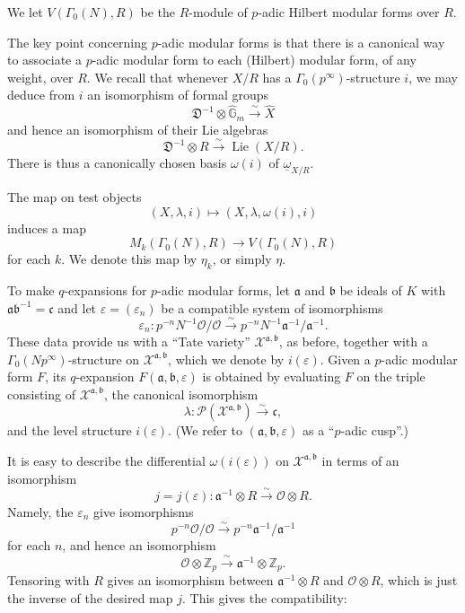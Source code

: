 \documentclass[12pt,a4paper]{article}
\theoremstyle{plain}
\theoremstyle{definition}
\theoremstyle{remark}
\DeclareMathOperator{\Lie}{Lie}
\begin{document}
We let $V(\Gamma_0(N), R)$ be the $R$-module of $p$-adic Hilbert modular forms over $R$.

The key point concerning $p$-adic modular forms is that there is a canonical way to associate a $p$-adic modular form to each (Hilbert) modular form, of any weight, over $R$. We recall that whenever $X/R$ has a $\Gamma_0(p^\infty)$-structure $i$, we may deduce from $i$ an isomorphism of formal groups
\[
\mathfrak{D}^{-1} \otimes \hat{\mathbb{G}}_m \xrightarrow{\sim} \hat{X}
\]
and hence an isomorphism of their Lie algebras
\[
\mathfrak{D}^{-1} \otimes R \xrightarrow{\sim} \Lie(X/R).
\]
There is thus a canonically chosen basis $\omega(i)$ of $\underline{\omega}_{X/R}$.

The map on test objects
\[
(X, \lambda, i) \longmapsto (X, \lambda, \omega(i), i)
\]
induces a map
\[
M_k(\Gamma_0(N), R) \longrightarrow V(\Gamma_0(N), R)
\]
for each $k$. We denote this map by $\eta_k$, or simply $\eta$.

To make $q$-expansions for $p$-adic modular forms, let $\mathfrak{a}$ and $\mathfrak{b}$ be ideals of $K$ with $\mathfrak{a}\mathfrak{b}^{-1} = \mathfrak{c}$ and let $\varepsilon = (\varepsilon_n)$ be a compatible system of isomorphisms
\[
\varepsilon_n: p^{-n}N^{-1}\mathcal{O}/\mathcal{O} \xrightarrow{\sim} p^{-n}N^{-1}\mathfrak{a}^{-1}/\mathfrak{a}^{-1}.
\]
These data provide us with a ``Tate variety'' $\mathcal{X}^{\mathfrak{a},\mathfrak{b}}$, as before, together with a $\Gamma_0(Np^\infty)$-structure on $\mathcal{X}^{\mathfrak{a},\mathfrak{b}}$, which we denote by $i(\varepsilon)$. Given a $p$-adic modular form $F$, its $q$-expansion $F(\mathfrak{a}, \mathfrak{b}, \varepsilon)$ is obtained by evaluating $F$ on the triple consisting of $\mathcal{X}^{\mathfrak{a},\mathfrak{b}}$, the canonical isomorphism
\[
\lambda: \mathscr{P}(\mathcal{X}^{\mathfrak{a},\mathfrak{b}}) \xrightarrow{\sim} \mathfrak{c},
\]
and the level structure $i(\varepsilon)$. (We refer to $(\mathfrak{a}, \mathfrak{b}, \varepsilon)$ as a ``$p$-adic cusp''.)

It is easy to describe the differential $\omega(i(\varepsilon))$ on $\mathcal{X}^{\mathfrak{a},\mathfrak{b}}$ in terms of an isomorphism
\[
j = j(\varepsilon): \mathfrak{a}^{-1} \otimes R \xrightarrow{\sim} \mathcal{O} \otimes R.
\]
Namely, the $\varepsilon_n$ give isomorphisms
\[
p^{-n}\mathcal{O}/\mathcal{O} \xrightarrow{\sim} p^{-n}\mathfrak{a}^{-1}/\mathfrak{a}^{-1}
\]
for each $n$, and hence an isomorphism
\[
\mathcal{O} \otimes \mathbb{Z}_p \xrightarrow{\sim} \mathfrak{a}^{-1} \otimes \mathbb{Z}_p.
\]
Tensoring with $R$ gives an isomorphism between $\mathfrak{a}^{-1} \otimes R$ and $\mathcal{O} \otimes R$, which is just the inverse of the desired map $j$. This gives the compatibility:
\end{document}
